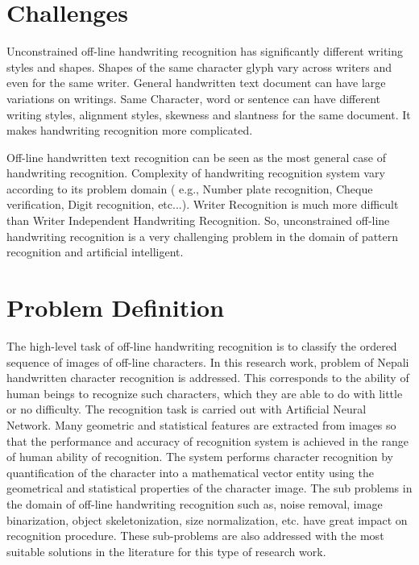 \section{Challenges}
Unconstrained off-line handwriting recognition has significantly different writing styles and shapes. Shapes of the same character glyph vary across writers and even for the same writer. General handwritten text document can have large variations on writings. Same Character, word or sentence  can have different writing styles, alignment styles, skewness and slantness for the same document. It makes handwriting recognition more complicated.

Off-line handwritten text recognition can be seen as the most general case of handwriting recognition. Complexity of handwriting recognition system vary according to its problem domain ( e.g., Number plate recognition, Cheque verification, Digit recognition, etc...). Writer Recognition is much more difficult than  Writer Independent Handwriting Recognition. So, unconstrained off-line handwriting recognition is a very challenging problem in the domain of pattern recognition and artificial intelligent.


\section{Problem Definition}
The high-level task of off-line handwriting recognition is to classify the ordered sequence of images of off-line characters. In this research work, problem of Nepali handwritten character recognition is addressed. This corresponds to the ability of human beings to recognize such characters, which they are able to do with little or no difficulty. The recognition task is carried out with Artificial Neural Network. Many geometric and statistical features are extracted from images so that the performance and accuracy of recognition system is achieved in the range of human ability of recognition. The system performs character recognition by quantification of the character into a mathematical vector entity using the geometrical and statistical properties of the character image.  The sub problems in the domain of off-line handwriting recognition such as, noise removal, image binarization, object skeletonization, size normalization, etc. have great impact on recognition procedure. These sub-problems are also addressed with the most suitable solutions in the literature for this type of research work.

